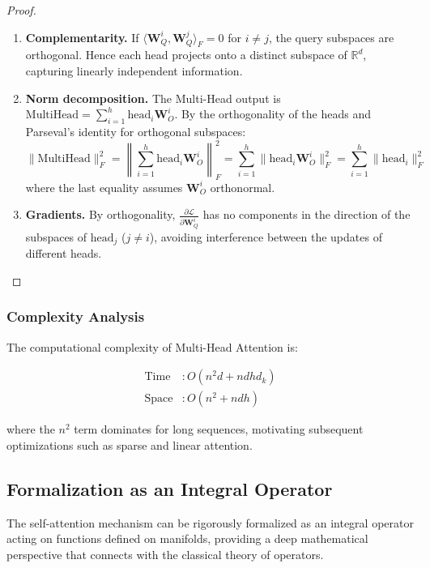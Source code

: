 \begin{proof}
\leavevmode
\begin{enumerate}
    \item \textbf{Complementarity.} If $\langle \mathbf{W}_Q^i, \mathbf{W}_Q^j \rangle_F = 0$ for $i \neq j$, the query subspaces are orthogonal. Hence each head projects onto a distinct subspace of $\mathbb{R}^d$, capturing linearly independent information.

    \item \textbf{Norm decomposition.} The Multi-Head output is $\text{MultiHead} = \sum_{i=1}^h \text{head}_i \mathbf{W}_O^i$. By the orthogonality of the heads and Parseval's identity for orthogonal subspaces:
    \[
    \|\text{MultiHead}\|_F^2 = \left\|\sum_{i=1}^h \text{head}_i \mathbf{W}_O^i\right\|_F^2 = \sum_{i=1}^h \|\text{head}_i \mathbf{W}_O^i\|_F^2 = \sum_{i=1}^h \|\text{head}_i\|_F^2
    \]
    where the last equality assumes $\mathbf{W}_O^i$ orthonormal.

    \item \textbf{Gradients.} By orthogonality, $\frac{\partial \mathcal{L}}{\partial \mathbf{W}_Q^i}$ has no components in the direction of the subspaces of $\text{head}_j$ ($j \neq i$), avoiding interference between the updates of different heads. \qedhere
\end{enumerate}
\end{proof}

\subsubsection{Complexity Analysis}

The computational complexity of Multi-Head Attention is:

\begin{align}
    \text{Time} &: O(n^2 d + ndhd_k) \\
    \text{Space} &: O(n^2 + ndh)
\end{align}

where the $n^2$ term dominates for long sequences, motivating subsequent optimizations such as sparse and linear attention.

\subsection{Formalization as an Integral Operator}\label{subsec:attention_integral_operator}

The self-attention mechanism can be rigorously formalized as an integral operator acting on functions defined on manifolds, providing a deep mathematical perspective that connects with the classical theory of operators.

